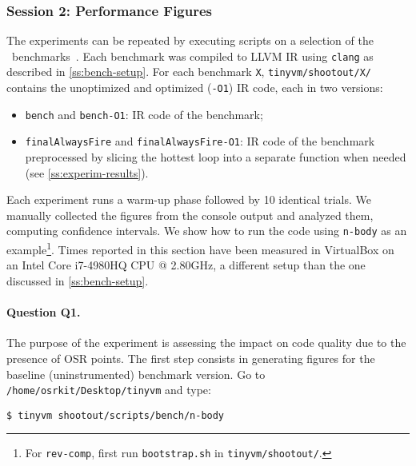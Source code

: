 
\subsubsection{Session 2: Performance Figures}

The experiments can be repeated by executing scripts on a selection of the \shootout\ benchmarks~\cite{shootout}. Each benchmark was compiled to LLVM IR using {\tt clang} as described in \mysection\ref{ss:bench-setup}. For each benchmark {\tt X}, {\small\tt tinyvm/shootout/X/} contains the unoptimized and optimized ({\tt -O1}) IR code, each in two versions:

\begin{itemize}[parsep=0pt]
\item {\tt bench} and {\tt bench-O1}: IR code of the benchmark;
\item {\tt finalAlwaysFire} and {\tt finalAlwaysFire-O1}: IR code of the benchmark preprocessed by slicing the hottest loop into a separate function when needed (see \ref{ss:experim-results}).
\end{itemize}

\noindent Each experiment runs a warm-up phase followed by 10 identical trials. We manually collected the figures from the console output and analyzed them, computing confidence intervals. We show how to run the code using {\tt n-body} as an example\footnote{For {\tt rev-comp}, first run {\tt bootstrap.sh} in {\tt tinyvm/shootout/}. }. Times reported in this section have been measured in VirtualBox on an Intel Core i7-4980HQ CPU @ 2.80GHz, a different setup than the one discussed in \ref{ss:bench-setup}.

\paragraph{Question Q1.} The purpose of the experiment is assessing the impact on code quality due to the presence of OSR points.
The first step consists in generating figures for the baseline (uninstrumented) benchmark version. Go to {\small\tt /home/osrkit/Desktop/tinyvm} and type:
\begin{small}
\begin{verbatim}
$ tinyvm shootout/scripts/bench/n-body
\end{verbatim}
\end{small}

